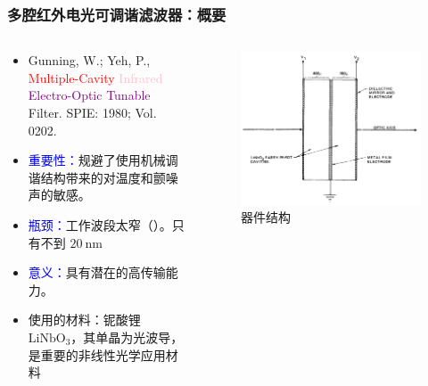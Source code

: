 \begin{frame}[c]
    \frametitle{多腔红外电光可调谐滤波器：概要}
    \begin{columns}
        \begin{column}{.6\textwidth}
            \begin{itemize}
                \item Gunning, W.; Yeh, P., \textcolor{red}{Multiple-Cavity} \textcolor{pink}{Infrared} \textcolor{purple}{Electro-Optic Tunable} Filter. SPIE: 1980; Vol. 0202.
                \item \textcolor{blue}{重要性：}规避了使用机械调谐结构带来的对温度和颤噪声的敏感。
                \item \textcolor{blue}{瓶颈：}工作波段太窄（）。只有不到 $20\ \mathrm{nm}$
                \item \textcolor{blue}{意义：}具有潜在的高传输能力。
                \item \footnotesize{使用的材料：铌酸锂 $\mathrm{LiNbO}_3$，其单晶为光波导，是重要的非线性光学应用材料}
            \end{itemize}
        \end{column}
        \begin{column}{.4\textwidth}
            \begin{figure}[H] %
                \centering %
                \includegraphics[width=1.\textwidth]{figures/Multiple-Cavity Infrared Electro-Optic Tunable Filter_2.png} %
                \caption{器件结构}
            \end{figure}
        \end{column}
    \end{columns}


\end{frame}
